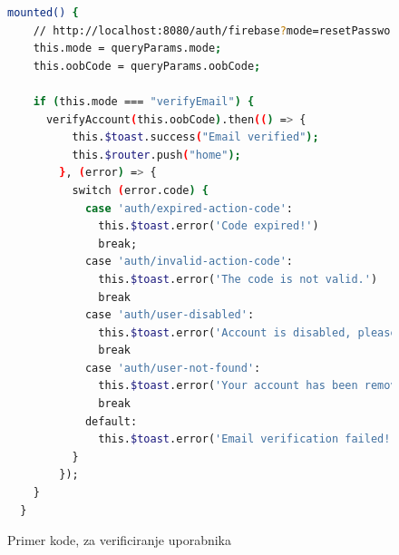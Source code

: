 \documentclass[a4paper, 12pt]{book}
\begin{document}
\begin{figure}
\centering
\begin{lstlisting}[language=bash, style=mystyle]
  mounted() {
    // http://localhost:8080/auth/firebase?mode=resetPassword&oobCode={code}
    this.mode = queryParams.mode;
    this.oobCode = queryParams.oobCode;

    if (this.mode === "verifyEmail") {
      verifyAccount(this.oobCode).then(() => {
          this.$toast.success("Email verified");
          this.$router.push("home");
        }, (error) => {
          switch (error.code) {
            case 'auth/expired-action-code':
              this.$toast.error('Code expired!')
              break;
            case 'auth/invalid-action-code':
              this.$toast.error('The code is not valid.')
              break
            case 'auth/user-disabled':
              this.$toast.error('Account is disabled, please contact us at support@example.com')
              break
            case 'auth/user-not-found':
              this.$toast.error('Your account has been removed')
              break
            default:
              this.$toast.error('Email verification failed!')
          }
        });
    }
  }
\end{lstlisting}
\caption{Primer kode, za verificiranje uporabnika}
\end{figure}
\end{document}
